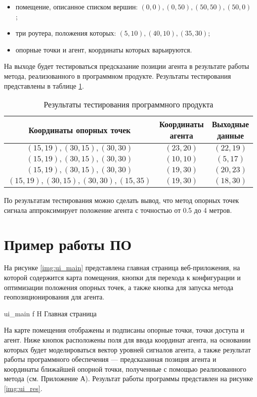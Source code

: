 \begin{itemize}[label=---]
    \item помещение, описанное списком вершин: $(0, 0), (0, 50), (50, 50), (50, 0)$;
    \item три роутера, положения которых: $(5, 10), (40, 10), (35, 30)$;
    \item опорные точки и агент, координаты которых варьируются.
\end{itemize}

На выходе будет тестироваться предсказание позиции агента в результате работы метода, реализованного в программном продукте. Результаты тестирования представлены в таблице \ref{tab:test}.

\begin{table}[H]
    \caption{Результаты тестирования программного продукта}
    \label{tab:test}
    \centering
    \begin{tabular}{|c|c|c|}
        \hline
        Координаты опорных точек & Координаты агента & Выходные данные \\
        \hline
        $(15, 19), (30, 15), (30, 30)$ & $(23, 20)$ & $(22, 19)$ \\
        \hline
        $(15, 19), (30, 15), (30, 30)$ & $(10, 10)$ & $(5, 17)$ \\
        \hline
        $(15, 19), (30, 15), (30, 30)$ & $(19, 30)$ & $(20, 23)$ \\
        \hline
        $(15, 19), (30, 15), (30, 30), (15, 35)$ & $(19, 30)$ & $(18, 30)$ \\
        \hline
    \end{tabular}
\end{table}

По результатам тестирования можно сделать вывод, что метод опорных точек сигнала аппроксимирует положение агента с точностью от 0.5 до 4 метров.

\section{Пример работы ПО}

На рисунке \ref{img:ui_main} представлена главная страница веб-приложения, на которой содержится карта помещения, кнопки для перехода к конфигурации и оптимизации положения опорных точек, а также кнопка для запуска метода геопозиционирования для агента.

    {ui_main}
    {f}
    {H}
    {\linewidth}
    {Главная страница}

На карте помещения отображены и подписаны опорные точки, точки доступа и агент. Ниже кнопок расположены поля для ввода координат агента, на основании которых будет моделироваться вектор уровней сигналов агента, а также результат работы программного обеспечения --- предсказанная позиция агента и координаты ближайшей опорной точки, полученные с помощью реализованного метода (см. Приложение А). Результат работы программы представлен на рисунке \ref{img:ui_res}.

